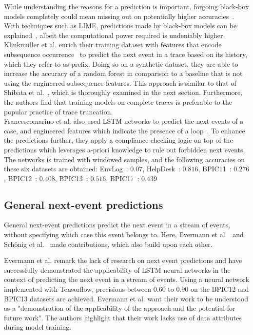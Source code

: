 While understanding the reasons for a prediction is important, forgoing black-box models completely could mean missing out on potentially higher accuracies~\cite{tax2018interdisciplinary}. With techniques such as LIME, predictions made by black-box models can be explained~\cite{ribeiro2016should}, albeit the computational power required is undeniably higher.\\

Klinkmüller et al. enrich their training dataset with features that encode subsequence occurrence~\cite{klinkmuller2018reliablemonitoring} to predict the next event in a trace based on its history, which they refer to as prefix. Doing so on a synthetic dataset, they are able to increase the accuracy of a random forest in comparison to a baseline that is not using the engineered subsequence features. This approach is similar to that of Shibata et al.~\cite{shibata2016bipartite}, which is thoroughly examined in the next section. Furthermore, the authors find that training models on complete traces is preferable to the popular practice of trace truncation.\\

Francescomarino et al. also used LSTM networks to predict the next events of a case, and engineered features which indicate the presence of a loop~\cite{francescomarino2017}. To enhance the predictions further, they apply a compliance-checking logic on top of the predictions which leverages a-priori knowledge to rule out forbidden next events. The networks is trained with windowed samples, and the following accuracies on these six datasets are obtained:
EnvLog~\cite{EnvLog}: $0.07$, HelpDesk~\cite{Helpdesk}: $0.816$, BPIC11~\cite{BPIC2011}: $0.276$, BPIC12~\cite{BPIC2012}: $0.408$, BPIC13~\cite{BPIC2013}: $0.516$, BPIC17~\cite{BPIC2017}: $0.439$

\subsection*{General next-event predictions}
General next-event predictions predict the next event in a stream of events, without specifying which case this event belongs to. Here, Evermann et al.~\cite{evermann2016} and Schönig et al.~\cite{schoenig2018} made contributions, which also build upon each other.

Evermann et al. remark the lack of research on next event predictions and have successfully demonstrated the applicability of LSTM neural networks in the context of predicting the next event in a stream of events. Using a neural network implemented with Tensorflow, precisions between $0.60$ to $0.90$ on the BPIC12 and BPIC13 datasets are achieved. Evermann et al. want their work to be understood as a "demonstration of the applicability of the approach and the potential for future work". The authors highlight that their work lacks use of data attributes during model training.

